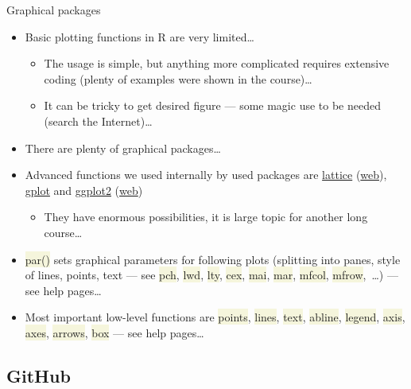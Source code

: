 \documentclass[compress, xelatex, 11pt, xcolor=svgnames, aspectratio=169, url={hyphens, lowtilde}]{beamer}
\renewcommand{\texttt}[1]{\colorbox{Beige}{{\ttfamily #1}}}
\begin{document}
\begin{frame}{Graphical packages}
	\begin{itemize}
		\item Basic plotting functions in R are very limited\ldots
		\begin{itemize}
			\item The usage is simple, but anything more complicated requires extensive coding (plenty of examples were shown in the course)\ldots
			\item It can be tricky to get desired figure --- some magic use to be needed (search the Internet)\ldots
		\end{itemize}
		\item There are plenty of graphical packages\ldots
		\item Advanced functions we used internally by used packages are \href{https://CRAN.R-project.org/package=lattice}{lattice} (\href{https://lattice.r-forge.r-project.org/}{web}), \href{https://CRAN.R-project.org/package=gplots}{gplot} and \href{https://CRAN.R-project.org/package=ggplot2}{ggplot2} (\href{https://ggplot2.tidyverse.org/}{web})
		\begin{itemize}
			\item They have enormous possibilities, it is large topic for another long course\ldots
		\end{itemize}
		\item \texttt{par()} sets graphical parameters for following plots (splitting into panes, style of lines, points, text --- see \texttt{pch}, \texttt{lwd}, \texttt{lty}, \texttt{cex}, \texttt{mai}, \texttt{mar}, \texttt{mfcol}, \texttt{mfrow},~\ldots) --- see help pages\ldots
		\item Most important low-level functions are \texttt{points}, \texttt{lines}, \texttt{text}, \texttt{abline}, \texttt{legend}, \texttt{axis}, \texttt{axes}, \texttt{arrows}, \texttt{box} --- see help pages\ldots
	\end{itemize}
\end{frame}

\subsection{GitHub}
\end{document}
